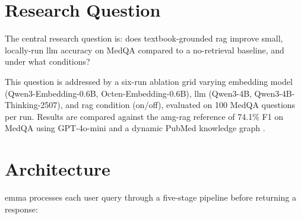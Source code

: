\section{Research Question}

The central research question is: does textbook-grounded \gls{rag} improve small, locally-run \gls{llm} accuracy on MedQA compared to a no-retrieval baseline, and under what conditions? 

This question is addressed by a six-run ablation grid varying embedding model (Qwen3-Embedding-0.6B, Octen-Embedding-0.6B), \gls{llm} (Qwen3-4B, Qwen3-4B-Thinking-2507), and \gls{rag} condition (on/off), evaluated on 100 MedQA questions per run. Results are compared against the \gls{amg-rag} reference of 74.1\% F1 on MedQA using GPT-4o-mini and a dynamic PubMed knowledge graph \cite{rezaei_agentic_2025}.

\section{Architecture}

\gls{emma} processes each user query through a five-stage pipeline before returning a response:

